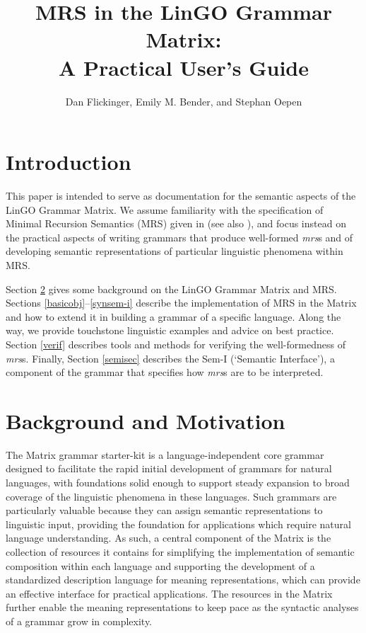\documentclass[12pt]{article}
\title{MRS in the LinGO Grammar Matrix:\\ A Practical User's Guide}
\author{Dan Flickinger, Emily M. Bender, and Stephan Oepen}
\begin{document}
\maketitle

\setcounter{tocdepth}{2}  %
\tableofcontents
\newpage
\section{Introduction}

This paper is intended to serve as documentation for the semantic
aspects of the LinGO Grammar Matrix. We assume familiarity with the
specification of Minimal Recursion Semantics (MRS) given in
 (see also ),
and focus instead on the practical aspects of writing grammars
that produce well-formed {\it mrs}s and of developing semantic
representations of particular linguistic phenomena within MRS.

Section \ref{backmot} gives some background on the LinGO Grammar
Matrix and MRS.  Sections \ref{basicobj}--\ref{synsem-i} describe
the implementation of MRS in the Matrix and how to extend it in
building a grammar of a specific language.  Along the way, we
provide touchstone linguistic examples and advice on best practice.
Section \ref{verif} describes tools
and methods for verifying the well-formedness of {\it mrs}s.  Finally,
Section \ref{semisec} describes the Sem-I (`Semantic Interface'), a component
of the grammar that specifies how {\it mrs}s are to be interpreted.

\section{Background and Motivation}
\label{backmot}

The Matrix grammar starter-kit \cite{Ben:Fli:Oep:02} is a
language-independent core grammar designed to facilitate the rapid
initial development of grammars for natural languages, with
foundations solid enough to support steady expansion to broad coverage
of the linguistic phenomena in these languages.  Such grammars are
particularly valuable because they can assign semantic representations
to linguistic input, providing the foundation for applications which
require natural language understanding.  As such, a central component
of the Matrix is the collection of resources it contains for
simplifying the implementation of semantic composition within each
language and supporting the development of a standardized description
language for meaning representations, which can provide an effective
interface for practical applications.  The resources in the Matrix
further enable the meaning representations to keep pace as the
syntactic analyses of a grammar grow in complexity.
\end{document}
